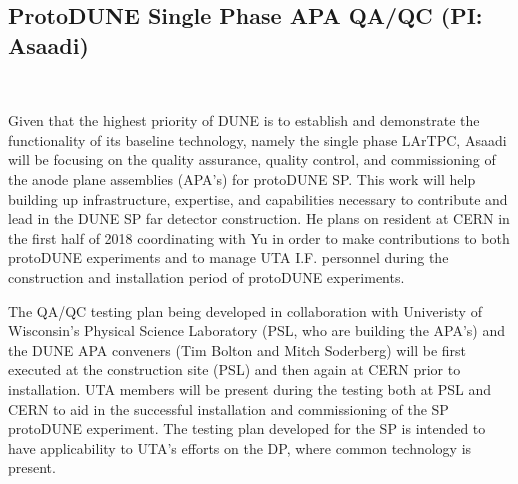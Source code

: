 \subsection{ProtoDUNE Single Phase APA QA/QC (PI: Asaadi)}~\label{sec:proto-dune-sp-apa}

Given that the highest priority of DUNE is to establish and demonstrate the functionality of its baseline technology, namely the single phase LArTPC, Asaadi will be focusing on the quality assurance, quality control, and commissioning of the anode plane assemblies (APA's) for protoDUNE SP. This work will help building up infrastructure, expertise, and capabilities necessary to contribute and lead in the DUNE SP far detector construction.  He plans on resident at CERN in the first half of 2018 coordinating with Yu in order to make contributions to both protoDUNE experiments and to manage UTA I.F. personnel during the construction and installation period of protoDUNE experiments. 

The QA/QC testing plan being developed in collaboration with Univeristy of Wisconsin's Physical Science Laboratory (PSL, who are building the APA's) and the DUNE APA conveners (Tim Bolton and Mitch Soderberg) will be first executed at the construction site (PSL) and then again at CERN prior to installation. UTA members will be present during the testing both at PSL and CERN to aid in the successful installation and commissioning of the SP protoDUNE experiment. The testing plan developed for the SP is intended to have applicability to UTA's efforts on the DP, where common technology is present. 
